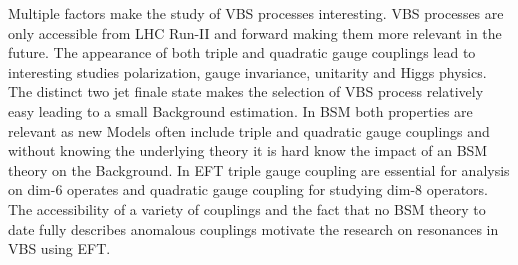 \documentclass[../Bachelorarbeit.tex]{subfiles}
\begin{document}
Multiple factors make the study of VBS processes interesting. VBS processes are only accessible from LHC Run-II and forward making them more relevant in the future.
The appearance of both triple and quadratic gauge couplings lead to interesting studies polarization, gauge invariance, unitarity and Higgs physics.
The distinct two jet finale state makes the selection of VBS process relatively easy leading to a small Background estimation. In BSM both properties
are relevant as new Models often include triple and quadratic gauge couplings and without knowing the underlying theory it is hard know the impact of an BSM theory on the Background.
In EFT triple gauge coupling are essential for analysis on dim-6 operates and quadratic gauge coupling for studying dim-8 operators. The accessibility of a variety of couplings and
the fact that no BSM theory to date fully describes anomalous couplings motivate the research on resonances in VBS using EFT.
\end{document}
